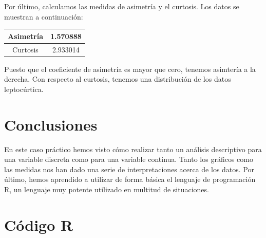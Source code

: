 \documentclass[12pt,a4paper,twoside,openright,titlepage,final]{article}
\begin{document}
Por último, calculamos las medidas de asimetría y el curtosis. Los datos se muestran a continuación:

\begin{table}[htbp]
\centering
\begin{tabular}{|c|c|}
\hline Asimetría & 1.570888 \\ 
\hline Curtosis & 2.933014 \\
\hline 
\end{tabular} 
\end{table}

Puesto que el coeficiente de asimetría es mayor que cero, tenemos asimtería a la derecha. Con respecto al curtosis, tenemos una distribución de los datos leptocúrtica. 


\section{Conclusiones}

En este caso práctico hemos visto cómo realizar tanto un análisis descriptivo para una variable discreta como para una variable continua. Tanto los gráficos como las medidas nos han dado una serie de interpretaciones acerca de los datos. Por último, hemos aprendido a utilizar de forma básica el lenguaje de programación R, un lenguaje muy potente utilizado en multitud de situaciones.

\newpage

\section{Código R}


\end{document}
